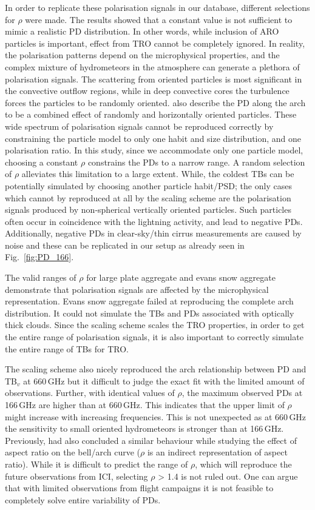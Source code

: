 \documentclass[amt, manuscript]{copernicus}
\begin{document}
In order to replicate these polarisation signals in our database,  different selections for $\rho$ were made. The results showed that a constant value is not sufficient to mimic a realistic PD distribution. In other words, while inclusion of ARO particles is important, effect from TRO cannot be completely ignored. In reality, the polarisation patterns depend on the microphysical properties, and the complex mixture of hydrometeors in the atmosphere can generate a plethora of polarisation signals. The scattering from oriented particles is most significant in the convective outflow regions, while in deep convective cores the turbulence forces the particles to be randomly oriented. \citet{gong:micro:17} also describe the PD along the arch to be a combined effect of randomly and horizontally oriented particles. These wide spectrum of polarisation signals cannot be reproduced correctly by constraining the particle model to only one habit and size distribution, and one polarisation ratio. In this study, since we accommodate only one particle model, choosing a constant $\rho$ constrains the PDs to a narrow range. A random selection of $\rho$ alleviates this limitation to a large extent. While, the coldest TBs can be potentially simulated by choosing another particle habit/PSD; the only cases which cannot by reproduced at all by the scaling scheme are the polarisation signals produced by non-spherical vertically oriented particles. Such particles often occur in coincidence with the lightning activity, and lead to negative PDs. Additionally, negative PDs in clear-sky/thin cirrus measurements are caused by noise and these can be replicated in our setup as already seen in Fig.~\ref{fig:PD_166}.  

The valid ranges of $\rho$ for large plate aggregate and evans snow aggregate demonstrate that polarisation signals are affected by the microphysical representation. Evans snow aggregate failed at reproducing the complete arch distribution. It could not simulate the TBs and PDs associated with optically thick clouds. Since the scaling scheme scales the TRO properties, in order to get the entire range of polarisation signals, it is also important to correctly simulate the  entire range of TBs for TRO.

The scaling scheme also nicely reproduced the arch relationship between PD and TB$_v$ at 660\,GHz but it difficult to judge the exact fit with the limited amount of observations. Further, with identical values of $\rho$, the maximum observed PDs at 166\,GHz are higher than at 660\,GHz. This indicates that the upper limit of $\rho$ might increase with increasing frequencies. This is not unexpected as at 660\,GHz the sensitivity to small oriented hydrometeors is stronger than at 166\,GHz. Previously, \citet{gong:micro:17} had also concluded a similar behaviour while studying the effect of aspect ratio on the bell/arch curve ($\rho$ is an indirect representation of aspect ratio). While it is difficult to predict the range of $\rho$, which will reproduce the future observations from ICI, selecting $\rho$ > 1.4 is not ruled out. One can argue that with limited observations from flight campaigns it is not feasible to completely solve entire variability of PDs. 
\end{document}
